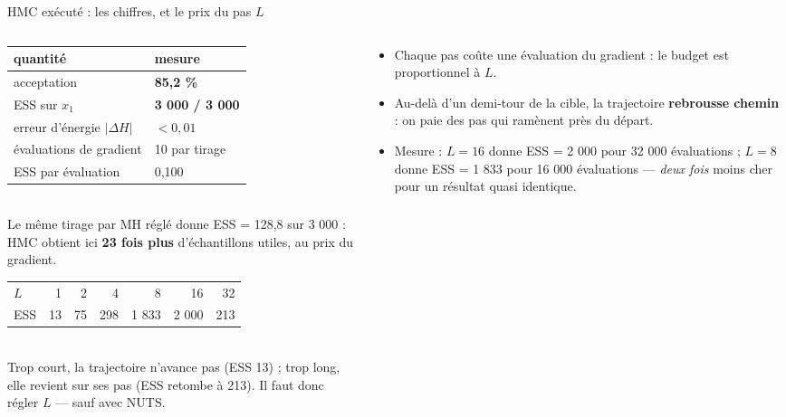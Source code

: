\begin{frame}{HMC exécuté : les chiffres, et le prix du pas $L$}
\footnotesize
\begin{columns}[t]
\begin{column}{0.49\textwidth}
\begin{solbox}[HMC maison, 3 000 itérations, $\varepsilon = 0{,}30$, $L = 10$]
\begin{tabular}{@{}ll@{}}
\toprule
quantité & mesure \\
\midrule
acceptation & \textbf{85,2 \%} \\
ESS sur $x_1$ & \textbf{3 000 / 3 000} \\
erreur d'énergie $|\Delta H|$ & $< 0{,}01$ \\
évaluations de gradient & 10 par tirage \\
ESS par évaluation & 0,100 \\
\bottomrule
\end{tabular}
\vspace{1.5mm}
\\ Le même tirage par MH réglé donne ESS = 128,8 sur 3 000 : HMC obtient ici
\textbf{23 fois plus} d'échantillons utiles, au prix du gradient.
\end{solbox}
\begin{kbox}
\begin{tabular}{@{}lrrrrrr@{}}
\toprule
$L$ & 1 & 2 & 4 & 8 & 16 & 32 \\
ESS & 13 & 75 & 298 & 1 833 & 2 000 & 213 \\
\bottomrule
\end{tabular}
\vspace{1mm}
\\ Trop court, la trajectoire n'avance pas (ESS 13) ; trop long, elle revient sur
ses pas (ESS retombe à 213). Il faut donc régler $L$ --- sauf avec NUTS.
\end{kbox}
\end{column}
\begin{column}{0.49\textwidth}
\begin{qbox}
\begin{itemize}
  \item Chaque pas coûte une évaluation du gradient : le budget est
        proportionnel à $L$.
  \item Au-delà d'un demi-tour de la cible, la trajectoire \textbf{rebrousse
        chemin} : on paie des pas qui ramènent près du départ.
  \item Mesure : $L = 16$ donne ESS = 2 000 pour 32 000 évaluations ; $L = 8$
        donne ESS = 1 833 pour 16 000 évaluations --- \emph{deux fois} moins
        cher pour un résultat quasi identique.
\end{itemize}
\end{qbox}
\end{column}
\end{columns}
\end{frame}

